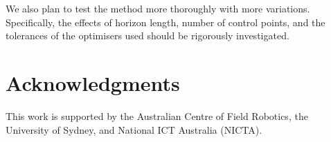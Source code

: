 \documentclass{article}
\begin{document}
	We also plan to test the method more thoroughly with more variations. Specifically, the effects of horizon length, number of control points, and the tolerances of the optimisers used should be rigorously investigated. 
	
\section*{Acknowledgments}

	This work is supported by the Australian Centre of Field Robotics, the University of Sydney, and National ICT Australia (NICTA).
	
%
%



\end{document}
